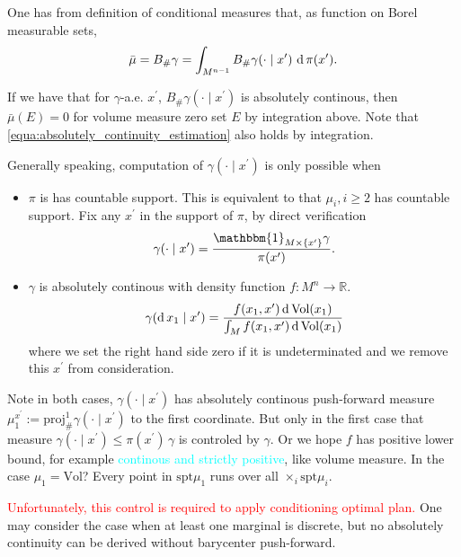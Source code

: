 One has from definition of conditional measures that,
as function on Borel measurable sets,
\[
	\bar{\mu} = B_{\#} \gamma = \int_{M^{n-1}} B_{\#} \gamma(\cdot \mid x^\prime)\, \operatorname{d} \pi(x^\prime).
\]


If we have that for $\gamma$-a.e. $x^\prime$,
$B_{\#} \gamma(\cdot \mid x^\prime)$
is absolutely continous,
then $\bar{\mu}(E)=0$ for volume measure zero set $E$ by integration above.
Note that \cref{equa:absolutely_continuity_estimation} also holds by integration.

Generally speaking, computation of $\gamma(\cdot \mid x^\prime)$ is only possible when
\begin{itemize}
	\item $\pi$ is has countable support.
	      This is equivalent to that $\mu_i, i \geq 2$ has countable support.
	      Fix any $x^\prime$ in the support of $\pi$, by direct verification
	      \[
		      \gamma(\cdot \mid x^\prime) =
		      \frac{
			      \mathbbm{1}_{M \times \{x^\prime\}}
			      \gamma
		      }{\pi(x^\prime)}.
	      \]
	\item $\gamma$ is absolutely continous with density function $f: M^n \rightarrow \mathbb{R} $.
	      \[
		      \gamma(\operatorname{d} x_1 \mid x^\prime) =
		      \frac{
			      f(x_1, x^\prime) \operatorname{d} \text{Vol}(x_1)
		      }
		      {\int_{M} f(x_1, x^\prime) \operatorname{d} \text{Vol}(x_1)
		      }
	      \]
	      where we set the right hand side zero if it is undeterminated
	      and we remove this $x^\prime$ from consideration.
\end{itemize}
Note in both cases,
$\gamma(\cdot \mid x^\prime)$
has absolutely continous push-forward measure
$\mu_1^{x^\prime} := \text{proj}^1_{\#}\gamma(\cdot \mid x^\prime)$
to the first coordinate.
But only in the first case that
measure $\gamma(\cdot \mid x^\prime) \leq \pi(x^\prime) \, \gamma$ is controled by $\gamma$.
Or we hope $f$ has positive lower bound,
for example \textcolor{cyan}{continous and strictly positive}, like volume measure.
In the case $\mu_1=\text{Vol}$? Every point in $\text{spt}\mu_1$ runs over all $\times_i \text{spt}\mu_i$.

\textcolor{red}{Unfortunately, this control is required to apply conditioning optimal plan.}
One may consider the case when at least one marginal is discrete,
but no absolutely continuity can be derived without barycenter push-forward.

